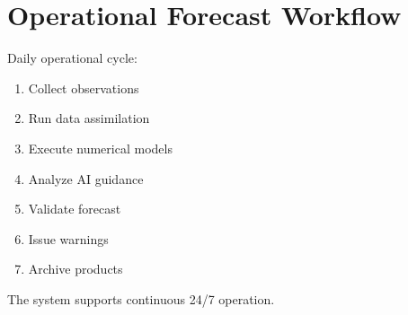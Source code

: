 \section{Operational Forecast Workflow}



Daily operational cycle:


\begin{enumerate}

\item Collect observations

\item Run data assimilation

\item Execute numerical models

\item Analyze AI guidance

\item Validate forecast

\item Issue warnings

\item Archive products

\end{enumerate}



The system supports continuous 24/7 operation.
